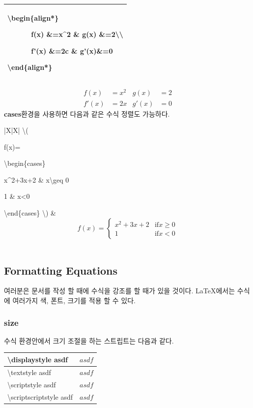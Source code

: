 \documentclass[12pt]{article}
\begin{document}
	\begin{tabularx}{\textwidth\onehalfspacing}{|X|}
		\hline
		\textbackslash begin\{align*\}
		
		\ \ \ \ \ \ f(x) \&=x\textasciicircum2 \& g(x) \&=2\textbackslash\textbackslash
		
		\ \ \ \ \ \ f'(x) \&=2c \& g'(x)\&=0
		
		\textbackslash end\{align*\}\\
		\hline
	\end{tabularx}
	\begin{align*}
	f(x) &=x^2 & g(x)&=2\\
	f'(x) &=2x & g'(x)&=0
	\end{align*}
	\textbf{cases}환경을 사용하면 다음과 같은 수식 정렬도 가능하다.\newline
	
	\begin{tabularx}{\textwidth\onehalfspacing}{|X|X|}
		\hline
		\textbackslash(
		
		f(x)=
		
		\textbackslash begin\{cases\}
		
		x\textasciicircum2+3x+2 \& x\textbackslash geq 0
		
		1 \&\text{if} x<0
		
		\textbackslash end\{cases\}
		\textbackslash)
		&
		\[f(x)=
		\begin{cases}
		x^2+3x+2 & \text{if} x \geq 0\\
		1 & \text{if} x <0
		\end{cases}\]
		\\
		\hline
	\end{tabularx}
	\subsection{Formatting Equations}
	여러분은 문서를 작성 할 때에 수식을 강조를 할 때가 있을 것이다. \LaTeX 에서는 수식에 여러가지 색, 폰트, 크기를 적용 할 수 있다.
	\subsubsection{size}
	수식 환경안에서 크기 조절을 하는 스트립트는 다음과 같다.\newline
	
	\begin{tabularx}{\textwidth\onehalfspacing}{|X|X|}
		\hline
		\textbackslash displaystyle asdf&\(\displaystyle asdf\)\\
		\hline
		\textbackslash textstyle asdf&\(\textstyle asdf \)\\
		\hline
		\textbackslash scriptstyle asdf&\(\scriptstyle asdf \)\\
		\hline
		\textbackslash scriptscriptstyle asdf&\(\scriptscriptstyle asdf \)\\
		\hline
	\end{tabularx}
	\clearpage
\end{document}
